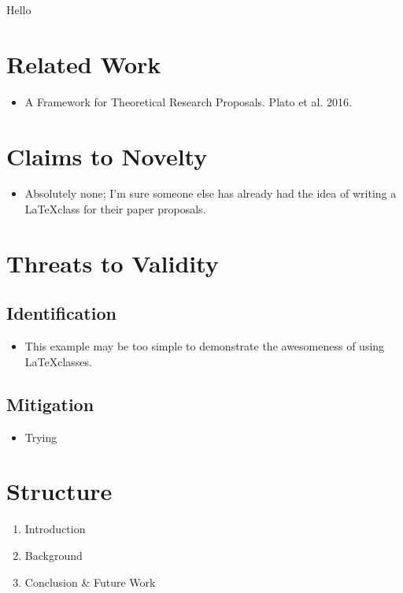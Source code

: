 \documentclass{paper_proposal}
\begin{document}

Hello

\section{Related Work}
\begin{itemize}
  \item A Framework for Theoretical Research Proposals. Plato et al. 2016.
\end{itemize}

%
\section{Claims to Novelty}
\begin{itemize}
  \item Absolutely none; I'm sure someone else has already had the idea of
    writing a \LaTeX class for their paper proposals.
\end{itemize}

\section{Threats to Validity}

\subsection{Identification}
\begin{itemize}
  \item This example may be too simple to demonstrate the awesomeness of using
    \LaTeX classes.
\end{itemize}

\subsection{Mitigation}
\begin{itemize}
  \item Trying 
\end{itemize}

\section{Structure}

\begin{enumerate}
  \item Introduction
  \item Background
  \item Conclusion \& Future Work
\end{enumerate}
\end{document}

